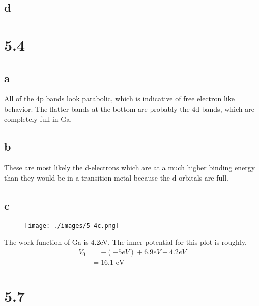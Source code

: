 \documentclass[12pt]{article}
\renewcommand{\=}[1]{\stackrel{#1}{=}} %
\theoremstyle{definition}
\theoremstyle{remark}
\begin{document}
\subsection*{d}

\newpage
\section*{5.4}

\subsection*{a}
All of the 4p bands look parabolic, which is indicative of free electron like behavior. The flatter bands at the bottom are probably the 4d bands, which are completely full in Ga.

\subsection*{b}
These are most likely the d-electrons which are at a much higher binding energy than they would be in a transition metal because the d-orbitals are full.

\subsection*{c}
\begin{figure}[H]
\centering
\texttt{[image: ./images/5-4c.png]}
\label{5-4c}
\end{figure}

The work function of Ga is 4.2eV. The inner potential for this plot is roughly,
\begin{align*}
V_0 &= -(-5eV) + 6.9eV + 4.2eV\\[2mm]
	&= 16.1 \,\, \text{eV}
\end{align*}

\newpage
\section*{5.7}
\end{document}
